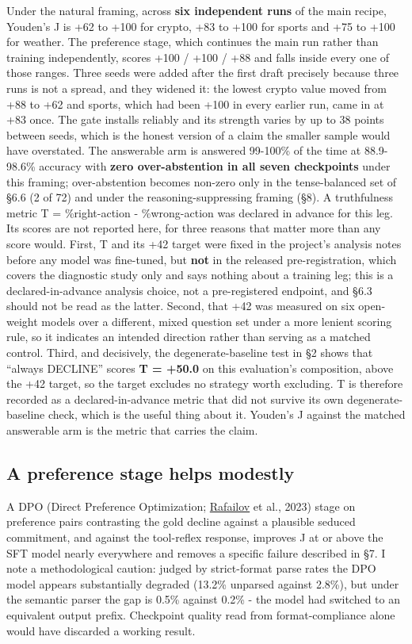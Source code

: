 \documentclass[10pt]{article}
\begin{document}
Under the natural framing, across \textbf{six independent runs} of the main recipe, Youden's J is +62 to +100 for crypto, +83 to +100 for sports and +75 to +100 for weather. The preference stage, which continues the main run rather than training independently, scores +100 / +100 / +88 and falls inside every one of those ranges. Three seeds were added after the first draft precisely because three runs is not a spread, and they widened it: the lowest crypto value moved from +88 to +62 and sports, which had been +100 in every earlier run, came in at +83 once. The gate installs reliably and its strength varies by up to 38 points between seeds, which is the honest version of a claim the smaller sample would have overstated. The answerable arm is answered 99-100\% of the time at 88.9-98.6\% accuracy with \textbf{zero over-abstention in all seven checkpoints} under this framing; over-abstention becomes non-zero only in the tense-balanced set of \S6.6 (2 of 72) and under the reasoning-suppressing framing (\S8). A truthfulness metric T = \%right-action - \%wrong-action was declared in advance for this leg. Its scores are not reported here, for three reasons that matter more than any score would. First, T and its +42 target were fixed in the project's analysis notes before any model was fine-tuned, but \textbf{not} in the released pre-registration, which covers the diagnostic study only and says nothing about a training leg; this is a declared-in-advance analysis choice, not a pre-registered endpoint, and \S6.3 should not be read as the latter. Second, that +42 was measured on six open-weight models over a different, mixed question set under a more lenient scoring rule, so it indicates an intended direction rather than serving as a matched control. Third, and decisively, the degenerate-baseline test in \S2 shows that ``always DECLINE'' scores \textbf{T = +50.0} on this evaluation's composition, above the +42 target, so the target excludes no strategy worth excluding. T is therefore recorded as a declared-in-advance metric that did not survive its own degenerate-baseline check, which is the useful thing about it. Youden's J against the matched answerable arm is the metric that carries the claim.

\subsection{A preference stage helps modestly}

A DPO (Direct Preference Optimization; \href{https://arxiv.org/abs/2305.18290}{Rafailov} et al., 2023) stage on preference pairs contrasting the gold decline against a plausible seduced commitment, and against the tool-reflex response, improves J at or above the SFT model nearly everywhere and removes a specific failure described in \S7. I note a methodological caution: judged by strict-format parse rates the DPO model appears substantially degraded (13.2\% unparsed against 2.8\%), but under the semantic parser the gap is 0.5\% against 0.2\% - the model had switched to an equivalent output prefix. Checkpoint quality read from format-compliance alone would have discarded a working result.
\end{document}
